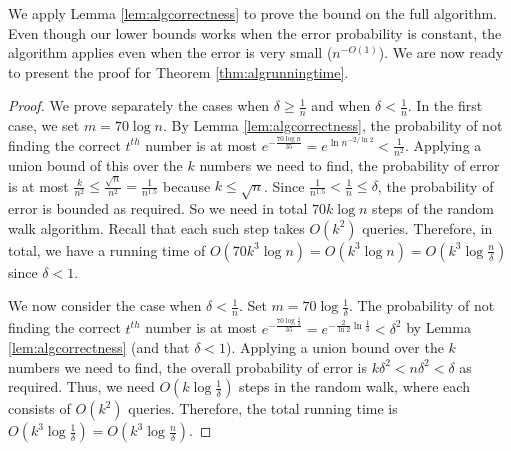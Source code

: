 \documentclass[12pt]{article}
\begin{document}
We apply Lemma \ref{lem:algcorrectness} to prove the bound on the full algorithm.  
Even though our lower bounds works when the error probability is constant, the algorithm applies even when the error is very small ($n^{-O(1)}$).  We are now ready to present the proof for Theorem \ref{thm:algrunningtime}.

\begin{proof}
We prove separately the cases when $\delta \geq \frac{1}{n}$ and when $\delta < \frac{1}{n}$. In the first case, we set $m = 70\log{n}$. By Lemma \ref{lem:algcorrectness}, the probability of not finding the correct $t^{th}$ number is at most $e^{-\frac{70\log{n}}{35}} = e^{\ln{n^{-2 / \ln{2}}}} < \frac{1}{n^2}$. Applying a union bound of this over the $k$ numbers we need to find, the probability of error is at most $\frac{k}{n^2} \leq \frac{\sqrt{n}}{n^2} = \frac{1}{n^{1.5}}$ because $k \leq \sqrt{n}$. Since $\frac{1}{n^{1.5}} < \frac{1}{n} \leq \delta$, the probability of error is bounded as required. So we need in total $70k\log{n}$ steps of the random walk algorithm. Recall that each such step takes $O(k^2)$ queries. Therefore, in total, we have a running time of $O(70k^3\log{n}) = O(k^3\log{n}) = O(k^3\log{\frac{n}{\delta}})$ since $\delta < 1$. 

We now consider the case when $\delta < \frac{1}{n}$. Set $m = 70\log{\frac{1}{\delta}}$. The probability of not finding the correct $t^{th}$ number is at most $e^{-\frac{70\log{\frac{1}{\delta}}}{35}} = e^{-\frac{2}{\ln{2}} \ln{\frac{1}{\delta}}} < \delta^2$ by Lemma \ref{lem:algcorrectness} (and that $\delta < 1$). Applying a union bound over the $k$ numbers we need to find, the overall probability of error is $k\delta^2 < n\delta^2 < \delta$ as required. Thus, we need $O\left(k\log{\frac{1}{\delta}}\right)$ steps in the random walk, where each consists of $O(k^2)$ queries. Therefore, the total running time is $O\left(k^3\log{\frac{1}{\delta}}\right) = O\left(k^3\log{\frac{n}{\delta}}\right)$.
\end{proof}
\end{document}
